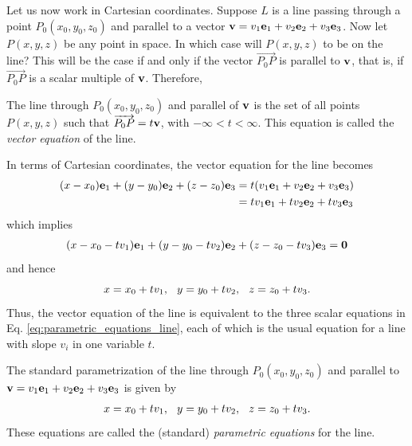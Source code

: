 \documentclass[12pt,letterpaper,reqno]{article}
\numberwithin{equation}{section}
\newcommand{\ti}[1]{\textit{#1}}
\begin{document}
Let us now work in Cartesian coordinates. Suppose $L$ is a line passing through a point $P_0(x_0,y_0,z_0)$ and parallel to a vector ${\bf v}=v_1{\bf e}_1+v_2{\bf e}_2+v_3{\bf e}_3$. Now let $P(x,y,z)$ be any point in space. In which case will $P(x,y,z)$ to be on the line? This will be the case if and only if the vector $\overrightarrow{P_0P}$ is parallel to ${\bf v}$, that is, if $\overrightarrow{P_0P}$ is a scalar multiple of ${\bf v}$. Therefore,
\begin{defn}
	The line through $P_0(x_0,y_0,z_0)$ and parallel of ${\bf v}$ is the set of all points $P(x,y,z)$ such that $\overrightarrow{P_0P}=t{\bf v}$, with $-\infty < t < \infty$. This equation is called the \ti{vector equation} of the line.
\end{defn}
In terms of Cartesian coordinates, the vector equation for the line becomes
\begin{align*}
	(x-x_0){\bf e}_1+(y-y_0){\bf e}_2+(z-z_0){\bf e}_3&=t(v_1{\bf e}_1+v_2{\bf e}_2+v_3{\bf e}_3) \\
	&=tv_1{\bf e}_1+tv_2{\bf e}_2+tv_3{\bf e}_3
\end{align*}
which implies
\begin{align*}
	(x-x_0-tv_1){\bf e}_1+(y-y_0-tv_2){\bf e}_2+(z-z_0-tv_3){\bf e}_3={\bf 0}
\end{align*}
and hence
\begin{equation}\label{eq:parametric_equations_line}
	x=x_0+tv_1, \hspace{0.25cm} y=y_0+tv_2, \hspace{0.25cm} z=z_0+tv_3.
\end{equation}
Thus, the vector equation of the line is equivalent to the three scalar equations in Eq. \eqref{eq:parametric_equations_line}, each of which is the usual equation for a line with slope $v_i$ in one variable $t$.

\begin{defn}
	The standard parametrization of the line through $P_0(x_0,y_0,z_0)$ and parallel to ${\bf v}=v_1{\bf e}_1+v_2{\bf e}_2+v_3{\bf e}_3$ is given by
	\begin{align*}
		x=x_0+tv_1, \hspace{0.25cm} y=y_0+tv_2, \hspace{0.25cm} z=z_0+tv_3.
	\end{align*}
	These equations are called the (standard) \ti{parametric equations} for the line.
\end{defn}
\end{document}
